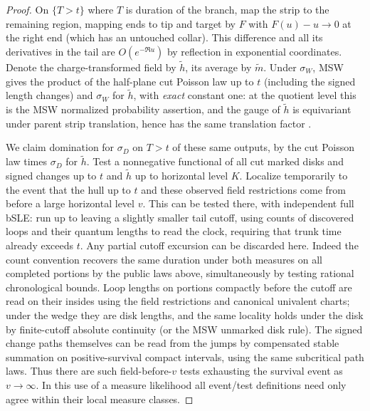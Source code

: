 \begin{proof}
On \(\{T>t\}\) where \(T\) is duration of the branch, map the strip to the remaining region, mapping ends to tip and target by \(F\) with \(F(u)-u\to0\) at the right end (which has an untouched collar).
This difference and all its derivatives in the tail are \(O(e^{-\Re u})\) by reflection in exponential coordinates.
Denote the charge-transformed field by \(\tilde h\), its average by \(\tilde m\).
Under \(\sigma_W\), MSW gives the product of the half-plane cut Poisson law up to \(t\) (including the signed length changes) and \(\sigma_W\) for \(\tilde h\), with \emph{exact} constant one: at the quotient level this is the MSW normalized probability assertion, and the gauge of \(\tilde h\) is equivariant under parent strip translation, hence has the same translation factor \citep[Proposition~4.1, Corollary~4.2, and Proposition~4.4]{MSWQuantum}.


We claim domination for \(\sigma_D\) on \(T>t\) of these same outputs, by the cut Poisson law times \(\sigma_D\) for \(\tilde h\).
Test a nonnegative functional of all cut marked disks and signed changes up to \(t\) and \(\tilde h\) up to horizontal level \(K\).
Localize temporarily to the event that the hull up to \(t\) and these observed field restrictions come from before a large horizontal level \(v\).
This can be tested there, with independent full bSLE: run up to leaving a slightly smaller tail cutoff, using counts of discovered loops and their quantum lengths to read the clock, requiring that trunk time already exceeds \(t\).
Any partial cutoff excursion can be discarded here.
Indeed the count convention recovers the same duration under both measures on all completed portions by the public laws above, simultaneously by testing rational chronological bounds.
Loop lengths on portions compactly before the cutoff are read on their insides using the field restrictions and canonical univalent charts; under the wedge they are disk lengths, and the same locality holds under the disk by finite-cutoff absolute continuity (or the MSW unmarked disk rule).
The signed change paths themselves can be read from the jumps by compensated stable summation on positive-survival compact intervals, using the same subcritical path laws.
Thus there are such field-before-\(v\) tests exhausting the survival event as \(v\to\infty\).
In this use of a measure likelihood all event/test definitions need only agree within their local measure classes.


\end{proof}
